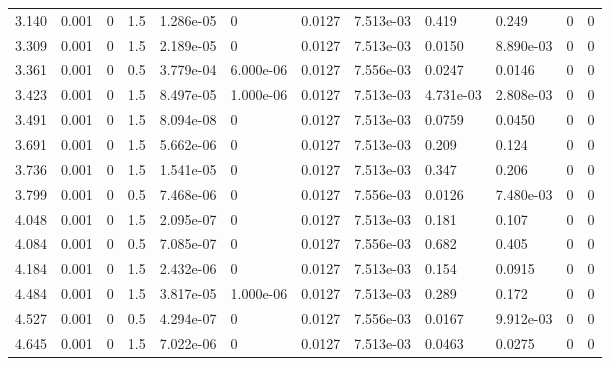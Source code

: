 \documentclass[preview]{standalone}
\begin{document}
{{\begin{tabular}{L{1.2cm}C{1.2cm} C{0.3cm}C{0.5cm} C{1.4cm}C{1.4cm} C{1.4cm}C{1.4cm} C{1.6cm}C{1.6cm} C{1.6cm}C{1.6cm}}
  3.140  &  0.001  & 0     & 1.5 &  1.286e-05  & 0  &  0.0127&   7.513e-03& 0.419 & 0.249   &  0 & 0  \\ 
  3.309  &  0.001  & 0     & 1.5 &  2.189e-05  & 0  &  0.0127&   7.513e-03& 0.0150 & 8.890e-03   &  0 & 0  \\ 
  3.361  &  0.001  & 0     & 0.5 &  3.779e-04  & 6.000e-06  &  0.0127&   7.556e-03& 0.0247 & 0.0146   &  0 & 0  \\ 
  3.423  &  0.001  & 0     & 1.5 &  8.497e-05  & 1.000e-06  &  0.0127&   7.513e-03& 4.731e-03 & 2.808e-03   &  0 & 0  \\ 
  3.491  &  0.001  & 0     & 1.5 &  8.094e-08  & 0  &  0.0127&   7.513e-03& 0.0759 & 0.0450   &  0 & 0  \\ 
  3.691  &  0.001  & 0     & 1.5 &  5.662e-06  & 0  &  0.0127&   7.513e-03& 0.209 & 0.124   &  0 & 0  \\ 
  3.736  &  0.001  & 0     & 1.5 &  1.541e-05  & 0  &  0.0127&   7.513e-03& 0.347 & 0.206   &  0 & 0  \\ 
  3.799  &  0.001  & 0     & 0.5 &  7.468e-06  & 0  &  0.0127&   7.556e-03& 0.0126 & 7.480e-03   &  0 & 0  \\ 
  4.048  &  0.001  & 0     & 1.5 &  2.095e-07  & 0  &  0.0127&   7.513e-03& 0.181 & 0.107   &  0 & 0  \\ 
  4.084  &  0.001  & 0     & 0.5 &  7.085e-07  & 0  &  0.0127&   7.556e-03& 0.682 & 0.405   &  0 & 0  \\ 
  4.184  &  0.001  & 0     & 1.5 &  2.432e-06  & 0  &  0.0127&   7.513e-03& 0.154 & 0.0915   &  0 & 0  \\ 
  4.484  &  0.001  & 0     & 1.5 &  3.817e-05  & 1.000e-06  &  0.0127&   7.513e-03& 0.289 & 0.172   &  0 & 0  \\ 
  4.527  &  0.001  & 0     & 0.5 &  4.294e-07  & 0  &  0.0127&   7.556e-03& 0.0167 & 9.912e-03   &  0 & 0  \\ 
  4.645  &  0.001  & 0     & 1.5 &  7.022e-06  & 0  &  0.0127&   7.513e-03& 0.0463 & 0.0275   &  0 & 0  \\ 
\hline 
\end{tabular} 

}}
\end{document}

